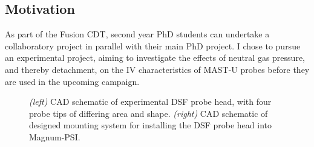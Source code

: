 \documentclass[a4paper, 11pt]{article} %
\begin{document}
\subsection{Motivation}
	As part of the Fusion CDT, second year PhD students can undertake a collaboratory project in parallel with their main PhD project. 
	I chose to pursue an experimental project, aiming to investigate the effects of neutral gas pressure, and thereby detachment, on the IV characteristics of MAST-U probes before they are used in the upcoming campaign.
	
	\begin{figure}
		\vspace{-10pt}
		\centering
		\caption{\label{fig:dsfprobe}\textit{(left)} CAD schematic of experimental DSF probe head, with four probe tips of differing area and shape. \textit{(right)} CAD schematic of designed mounting system for installing the DSF probe head into Magnum-PSI.}
		\vspace{-10pt}
	\end{figure}
\end{document}
